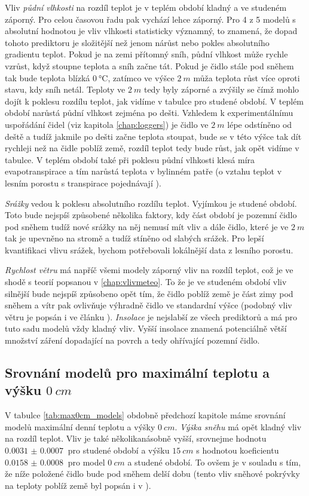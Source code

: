 Vliv \textit{půdní vlhkosti} na rozdíl teplot je v teplém období kladný a ve studeném záporný. Pro celou časovou řadu pak vychází lehce záporný. Pro 4 z 5 modelů s absolutní hodnotou je vliv vlhkosti statisticky významný, to znamená, že dopad tohoto prediktoru je složitější než jenom nárůst nebo pokles absolutního gradientu teplot. Pokud je na zemi přítomný sníh, půdní vlhkost může rychle vzrůst, když stoupne teplota a sníh začne tát. Pokud je čidlo stále pod sněhem tak bude teplota blízká $\SI{0}{\celsius}$, zatímco ve výšce $\SI{2}{m}$ můža teplota růst více oproti stavu, kdy sníh netál. Teploty ve $\SI{2}{m}$ tedy byly záporné a zvýšily se čímž mohlo dojít k poklesu rozdílu teplot, jak vidíme v tabulce pro studené období. V teplém období narůstá půdní vlhkost zejména po dešti. Vzhledem k experimentálnímu uspořádání čidel (viz kapitola \ref{chap:loggers}) je čidlo ve $\SI{2}{m}$ lépe odstíněno od deště a tudíž jakmile po dešti začne teplota stoupat, bude se v této výšce tak dít rychleji než na čidle poblíž země, rozdíl teplot tedy bude růst, jak opět vidíme v tabulce. V teplém období také při poklesu půdní vlhkosti klesá míra evapotranspirace a tím narůstá teplota v bylinném patře (o vztahu teplot v lesním porostu s transpirace pojednávají \parencite{snow_deFrenneForestMicroclimates}).

\textit{Srážky} vedou k poklesu absolutního rozdílu teplot. Vyjímkou je studené období. Toto bude nejspíš způsobené několika faktory, kdy část období je pozemní čidlo pod sněhem tudíž nové srážky na něj nemusí mít vliv a dále čidlo, které je ve $\SI{2}{m}$ tak je upevněno na stromě a tudíž stíněno od slabých srážek. Pro lepší kvantifikaci vlivu srážek, bychom potřebovali lokálnější data z lesního porostu.

\textit{Rychlost větru} má napříč všemi modely záporný vliv na rozdíl teplot, což je ve shodě s teorií popsanou v \ref{chap:vlivmeteo}. To že je ve studeném období vliv silnější bude nejspíš způsobeno opět tím, že čidlo poblíž země je část zimy pod sněhem a vítr pak ovlivňuje výhradně čidlo ve standardní výšce (podobný vliv větru je popsán i ve článku \parencite{wind_contrastingmicroclimates}). \textit{Insolace} je nejslabší ze všech prediktorů a má pro tuto sadu modelů vždy kladný vliv. Vyšší insolace znamená potenciálně větší množství záření dopadající na povrch a tedy ohřívající pozemní čidlo.

\subsection{Srovnání modelů pro maximální teplotu a výšku $\SI{0}{cm}$}
V tabulce \ref{tab:max0cm_models} obdobně předchozí kapitole máme srovnání modelů maximální denní teplotu a výšky $\SI{0}{cm}$. \textit{Výška sněhu} má opět kladný vliv na rozdíl teplot. Vliv je také několikanásobně vyšší, srovnejme hodnotu $\SI{0.0031(7)}{}$ pro studené období a výšku $\SI{15}{cm}$ s hodnotou koeficientu $\SI{0.0158(8)}{}$ pro model $\SI{0}{cm}$ a studené období. To ovšem je v souladu s tím, že níže položené čidlo bude pod sněhem delší dobu (tento vliv sněhové pokrývky na teploty poblíž země byl popsán i v \parencite{snow_deFrenneForestMicroclimates}).

